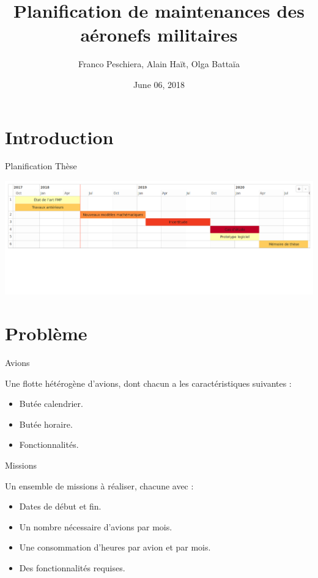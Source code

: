 \documentclass[ignorenonframetext,]{beamer}
\title{Planification de maintenances des aéronefs militaires}
\author{Franco Peschiera, Alain Haït, Olga Battaïa}
\institute{ISAE SUPAERO}
\date{June 06, 2018}
\providecommand{\tightlist}{%
  \setlength{\itemsep}{0pt}\setlength{\parskip}{0pt}}
\begin{document}
\frame{\titlepage}

\begin{frame}
\tableofcontents[hideallsubsections]
\end{frame}

\section{Introduction}\label{introduction}

\begin{frame}{Planification Thèse}

\includegraphics[width=1\linewidth]{./../../img/gantt_thesis}

\end{frame}

\section{Problème}\label{probleme}

\begin{frame}{Avions}

Une flotte hétérogène d'avions, dont chacun a les caractéristiques
suivantes :

\begin{itemize}[<+->]
\tightlist
\item
  Butée calendrier.
\item
  Butée horaire.
\item
  Fonctionnalités.
\end{itemize}

\end{frame}

\begin{frame}{Missions}

Un ensemble de missions à réaliser, chacune avec :

\begin{itemize}[<+->]
\tightlist
\item
  Dates de début et fin.
\item
  Un nombre nécessaire d'avions par mois.
\item
  Une consommation d'heures par avion et par mois.
\item
  Des fonctionnalités requises.
\end{itemize}

\end{frame}
\end{document}
